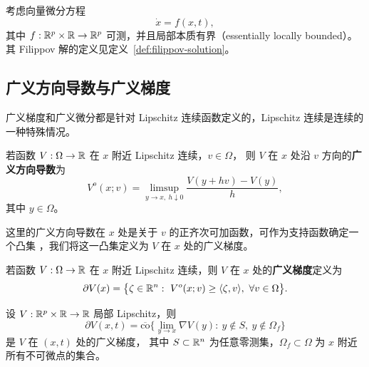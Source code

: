 考虑向量微分方程
\begin{equation}\label{eq:nonsmooth-diff}
  \dot{x}=f(x,t),
\end{equation}
其中 $f:\mathbb{R}^p\times\mathbb{R}\to\mathbb{R}^p$ 可测，并且局部本质有界（essentially locally bounded）。
其 Filippov 解的定义见定义~\ref{def:filippov-solution}。

\subsection{广义方向导数与广义梯度}

广义梯度和广义微分都是针对 Lipschitz 连续函数定义的，Lipschitz 连续是连续的一种特殊情况。

\begin{definition}[广义方向导数]\label{def:generalized-directional}
  \cite{clarkeOptimizationNonsmoothAnalysis1990}
  若函数 $V:\Omega\to\mathbb{R}$ 在 $x$ 附近 Lipschitz 连续，$v\in\Omega$，
  则 $V$ 在 $x$ 处沿 $v$ 方向的\textbf{广义方向导数}为
  \begin{equation}
    V^o(x;v)=\limsup_{y\to x,\ h\downarrow0}\frac{V(y+hv)-V(y)}{h},
  \end{equation}
  其中 $y\in\Omega$。
\end{definition}

这里的广义方向导数在 $x$ 处是关于 $v$ 的正齐次可加函数，可作为支持函数确定一个凸集
\cite{clarkeOptimizationNonsmoothAnalysis1990}，我们将这一凸集定义为 $V$ 在 $x$ 处的广义梯度。

\begin{definition}[广义梯度]\label{def:generalized-gradient}
  \cite{clarkeOptimizationNonsmoothAnalysis1990}
  若函数 $V:\Omega\to\mathbb{R}$ 在 $x$ 附近 Lipschitz 连续，则 $V$ 在 $x$ 处的\textbf{广义梯度}定义为
  \begin{equation}
    \partial V(x)=\big\{\zeta\in\RR^n:\ V^o(x;v)\ge\langle\zeta,v\rangle,\ \forall v\in\Omega\big\}.
  \end{equation}
\end{definition}

\begin{theorem}[广义梯度的计算]\label{thm:general-gradient}
  \cite{clarkeOptimizationNonsmoothAnalysis1990}
  设 $V:\mathbb{R}^p\times\mathbb{R}\to\mathbb{R}$ 局部 Lipschitz，则
  \begin{equation}\label{eq:general-gradient}
    \partial V(x,t)=\overline{\mathrm{co}}\Big\{\lim_{y\to x}\nabla V(y):\ y\notin S,\ y\notin\Omega_f\Big\}
  \end{equation}
  是 $V$ 在 $(x,t)$ 处的广义梯度，
  其中 $S\subset\mathbb{R}^n$ 为任意零测集，$\Omega_f\subset\Omega$ 为 $x$ 附近所有不可微点的集合。
\end{theorem}

